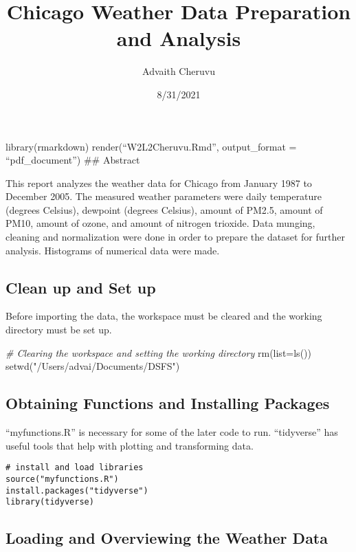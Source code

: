 \documentclass[
]{article}
\title{Chicago Weather Data Preparation and Analysis}
\author{Advaith Cheruvu}
\date{8/31/2021}
\newenvironment{Shaded}{\begin{snugshade}}{\end{snugshade}}
\newcommand{\AttributeTok}[1]{\textcolor[rgb]{0.77,0.63,0.00}{#1}}
\newcommand{\CommentTok}[1]{\textcolor[rgb]{0.56,0.35,0.01}{\textit{#1}}}
\newcommand{\FunctionTok}[1]{\textcolor[rgb]{0.00,0.00,0.00}{#1}}
\newcommand{\NormalTok}[1]{#1}
\newcommand{\StringTok}[1]{\textcolor[rgb]{0.31,0.60,0.02}{#1}}
\begin{document}
\maketitle

library(rmarkdown) render(``W2L2Cheruvu.Rmd'', output\_format =
``pdf\_document'') \#\# Abstract

This report analyzes the weather data for Chicago from January 1987 to
December 2005. The measured weather parameters were daily temperature
(degrees Celsius), dewpoint (degrees Celsius), amount of PM2.5, amount
of PM10, amount of ozone, and amount of nitrogen trioxide. Data munging,
cleaning and normalization were done in order to prepare the dataset for
further analysis. Histograms of numerical data were made.

\hypertarget{clean-up-and-set-up}{%
\subsection{Clean up and Set up}\label{clean-up-and-set-up}}

Before importing the data, the workspace must be cleared and the working
directory must be set up.

\begin{Shaded}
\begin{Highlighting}[]
\CommentTok{\# Clearing the workspace and setting the working directory}
\FunctionTok{rm}\NormalTok{(}\AttributeTok{list=}\FunctionTok{ls}\NormalTok{())}
\FunctionTok{setwd}\NormalTok{(}\StringTok{"/Users/advai/Documents/DSFS"}\NormalTok{)}
\end{Highlighting}
\end{Shaded}

\hypertarget{obtaining-functions-and-installing-packages}{%
\subsection{Obtaining Functions and Installing
Packages}\label{obtaining-functions-and-installing-packages}}

``myfunctions.R'' is necessary for some of the later code to run.
``tidyverse'' has useful tools that help with plotting and transforming
data.

\begin{verbatim}
# install and load libraries
source("myfunctions.R")
install.packages("tidyverse")
library(tidyverse)
\end{verbatim}

\hypertarget{loading-and-overviewing-the-weather-data}{%
\subsection{Loading and Overviewing the Weather
Data}\label{loading-and-overviewing-the-weather-data}}
\end{document}
